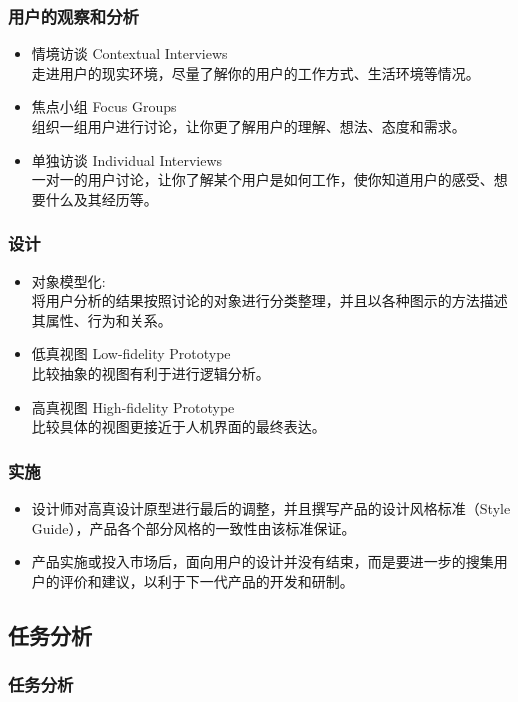 \documentclass{beamer}
\begin{document}
\begin{frame}
	\frametitle{用户的观察和分析}
	\begin{itemize}
		\item 情境访谈 Contextual Interviews\\{\tiny 走进用户的现实环境，尽量了解你的用户的工作方式、生活环境等情况。}
		\item 焦点小组 Focus Groups\\{\tiny 组织一组用户进行讨论，让你更了解用户的理解、想法、态度和需求。}
		\item 单独访谈 Individual Interviews\\{\tiny 一对一的用户讨论，让你了解某个用户是如何工作，使你知道用户的感受、想要什么及其经历等。}
	\end{itemize}
\end{frame}

\begin{frame}
	\frametitle{设计}
	\begin{itemize}
		\item 对象模型化: \\{\tiny 将用户分析的结果按照讨论的对象进行分类整理，并且以各种图示的方法描述其属性、行为和关系。}
		\item 低真视图 Low-fidelity Prototype\\{\tiny 比较抽象的视图有利于进行逻辑分析。}
		\item 高真视图 High-fidelity Prototype\\{\tiny 比较具体的视图更接近于人机界面的最终表达。}
	\end{itemize}
\end{frame}

\begin{frame}
	\frametitle{实施}
	\begin{itemize}
		\item 设计师对高真设计原型进行最后的调整，并且撰写产品的设计风格标准（Style Guide），产品各个部分风格的一致性由该标准保证。
		\item 产品实施或投入市场后，面向用户的设计并没有结束，而是要进一步的搜集用户的评价和建议，以利于下一代产品的开发和研制。
	\end{itemize}
\end{frame}

\subsection{任务分析}
\begin{frame}
	\frametitle{任务分析}

\end{frame}
\end{document}
